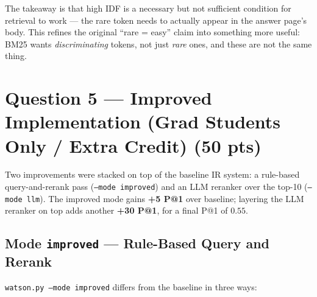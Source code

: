 \documentclass[11pt]{article}
\begin{document}
The takeaway is that high IDF is a necessary but not sufficient
condition for retrieval to work --- the rare token needs to actually
appear in the answer page's body. This refines the original ``rare =
easy'' claim into something more useful: BM25 wants \emph{discriminating}
tokens, not just \emph{rare} ones, and these are not the same thing.

\section{Question 5 --- Improved Implementation (Grad Students Only / Extra Credit) (50 pts)}

Two improvements were stacked on top of the baseline IR system: a
rule-based query-and-rerank pass (\texttt{--mode improved}) and an
LLM reranker over the top-10 (\texttt{--mode llm}). The improved mode
gains \textbf{+5 P@1} over baseline; layering the LLM reranker on
top adds another \textbf{+30 P@1}, for a final P@1 of $0.55$.

\subsection{Mode \texttt{improved} --- Rule-Based Query and Rerank}

\texttt{watson.py --mode improved} differs from the baseline in three ways:
\end{document}
